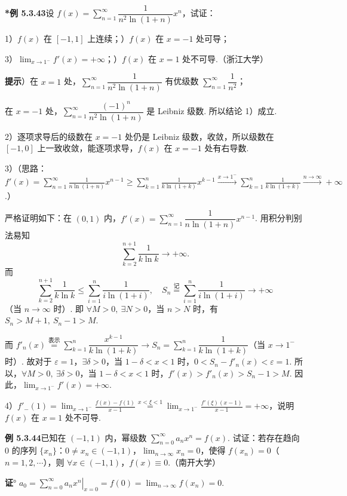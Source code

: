 \documentclass[UTF8,12pt,a4paper,fontset=fandol]{ctexart}
\begin{document}
\noindent\textbf{*例 5.3.43}\quad 设 $f(x)=\displaystyle\sum_{n=1}^{\infty}\dfrac1{n^2\ln(1+n)}x^n$，试证：

1）$f(x)$ 在 $[-1,1]$ 上连续；）$f(x)$ 在 $x=-1$ 处可导；

3）$\displaystyle\lim_{x\to1^-}f'(x)=+\infty$；）$f(x)$ 在 $x=1$ 处不可导.（浙江大学）

\noindent\textbf{提示}）在 $x=1$ 处，$\displaystyle\sum_{n=1}^{\infty}\dfrac1{n^2\ln(1+n)}$ 有优级数 $\displaystyle\sum_{n=1}^{\infty}\dfrac1{n^2}$；

在 $x=-1$ 处，$\displaystyle\sum_{n=1}^{\infty}\dfrac{(-1)^n}{n^2\ln(1+n)}$ 是 Leibniz 级数. 所以结论 1）成立.

2）逐项求导后的级数在 $x=-1$ 处仍是 Leibniz 级数，收敛，所以级数在 $[-1,0]$ 上一致收敛，能逐项求导，$f(x)$ 在 $x=-1$ 处有右导数.

3）（思路：$\displaystyle f'(x)=\sum_{n=1}^{\infty}\frac1{n\ln(1+n)}x^{n-1}\ge
\sum_{k=1}^n\frac1{k\ln(1+k)}x^{k-1}\xrightarrow{x\to1^-}
\sum_{k=1}^n\frac1{k\ln(1+k)}\xrightarrow{n\to\infty}+\infty$.）

严格证明如下：在 $(0,1)$ 内，$f'(x)=\displaystyle\sum_{n=1}^{\infty}\dfrac1{n\ln(1+n)}x^{n-1}$. 用积分判别法易知
\[
  \sum_{k=2}^{n+1}\frac1{k\ln k}\to+\infty.
\]
而
\[
  \sum_{k=2}^{n+1}\frac1{k\ln k}
  \le\sum_{i=1}^n\frac1{i\ln(1+i)},\quad
  S_n\overset{\text{记}}{=}\sum_{i=1}^n\frac1{i\ln(1+i)}\to+\infty
\]
（当 $n\to\infty$ 时）. 即 $\forall M>0,\ \exists N>0$，当 $n>N$ 时，有 $S_n>M+1,\ S_n-1>M$.

而 $f'_n(x)\overset{\text{表示}}{=}\displaystyle\sum_{k=1}^n\dfrac{x^{k-1}}{k\ln(1+k)}\to S_n=\displaystyle\sum_{k=1}^n\dfrac1{k\ln(1+k)}$（当 $x\to1^-$ 时）. 故对于 $\varepsilon=1$，$\exists\delta>0$，当 $1-\delta<x<1$ 时，$0<S_n-f'_n(x)<\varepsilon=1$. 所以，$\forall M>0,\ \exists\delta>0$，当 $1-\delta<x<1$ 时，$f'(x)>f'_n(x)>S_n-1>M$. 因此，$\displaystyle\lim_{x\to1^-}f'(x)=+\infty$.

4）$f'_-(1)=\displaystyle\lim_{x\to1^-}\frac{f(x)-f(1)}{x-1}
\stackrel{x<\xi<1}{=}
\lim_{x\to1^-}\frac{f'(\xi)(x-1)}{x-1}=+\infty$，说明 $f(x)$ 在 $x=1$ 处不可导.

\noindent\textbf{例 5.3.44}\quad 已知在 $(-1,1)$ 内，幂级数 $\displaystyle\sum_{n=0}^{\infty}a_nx^n=f(x)$. 试证：若存在趋向 0 的序列 $\{x_n\}$：$0\ne x_n\in(-1,1)$，$\displaystyle\lim_{n\to\infty}x_n=0$，使得 $f(x_n)=0$（$n=1,2,\cdots$），则 $\forall x\in(-1,1)$，$f(x)\equiv0$.（南开大学）

\noindent\textbf{证}° $a_0=\left.\displaystyle\sum_{n=0}^{\infty}a_nx^n\right|_{x=0}=f(0)=\displaystyle\lim_{n\to\infty}f(x_n)=0$.
\end{document}

